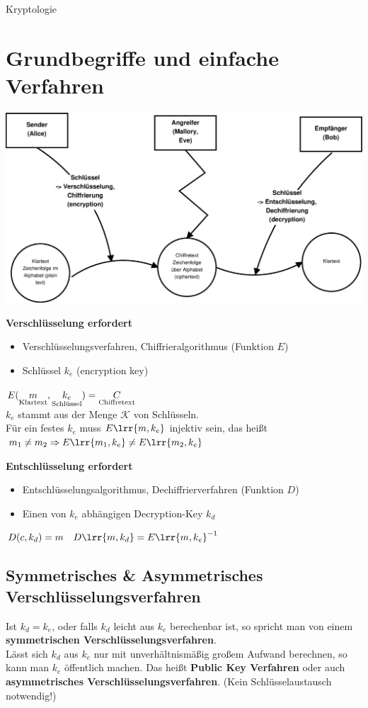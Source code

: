 \newpage
\begin{center}
	\huge{Kryptologie}
\end{center}
\section{Grundbegriffe und einfache Verfahren}
	\includegraphics[width=\textwidth]{eps/pic01.eps}

	\textbf{Verschlüsselung erfordert}
	\begin{itemize}
		\item Verschlüsselungsverfahren, Chiffrieralgorithmus (Funktion $E$)
		\item Schlüssel $k_e$ (encryption key)
	\end{itemize}
	$E(\underset{\mbox{\scriptsize Klartext}}{m},\underset{\mbox{\scriptsize Schlüssel}}{k_e})=\underset{\mbox{\scriptsize Chiffretext}}{C}$ \\
	$k_e$ stammt aus der Menge $\mathcal{K}$ von Schlüsseln.\\
	Für ein festes $k_e$ muss $E\lrr{m,k_e}$ injektiv sein, das heißt\\
	$m_1\neq m_2 \Rightarrow E\lrr{m_1,k_e}\neq E\lrr{m_2,k_e}$
	
	\textbf{Entschlüsselung erfordert}
	\begin{itemize}
		\item Entschlüsselungsalgorithmus, Dechiffrierverfahren (Funktion $D$)
		\item Einen von $k_e$ abhängigen Decryption-Key $k_d$
	\end{itemize}
	$D(c,k_d)=m\quad D\lrr{m,k_d}=E\lrr{m,k_e}^{-1}$
	\subsection{Symmetrisches \& Asymmetrisches Verschlüsselungsverfahren}
		Ist $k_d=k_e$, oder falls $k_d$ leicht aus $k_e$ berechenbar ist, so spricht man von einem \textbf{symmetrischen Verschlüsselungsverfahren}.\\
		Lässt sich $k_d$ aus $k_e$ nur mit unverhältnismäßig großem Aufwand berechnen, so kann man $k_e$ öffentlich machen. Das heißt \textbf{Public Key Verfahren} oder auch \textbf{asymmetrisches Verschlüsselungsverfahren}. (Kein Schlüsselaustausch notwendig!)
	
